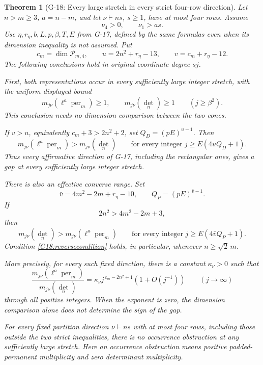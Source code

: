 \documentclass[11pt,a4paper]{article}
\newtheorem{theorem}{Theorem}
\theoremstyle{definition}\newtheorem{definition}{Definition}
\begin{document}
\begin{theorem}[G-18: Every large stretch in every strict four-row direction]\label{G-18}
Let $n>m\geq3$, $a=n-m$, and let $\nu\vdash ns$, $s\geq1$,
have at most four rows. Assume
\[
 \nu_4>0,\qquad \nu_1>as.
\]
Use $\eta,r_\eta,b,L,p,\beta,T,E$ from G-17, defined by the same
formulas even when its dimension inequality is not assumed. Put
\[
 c_m=\dim\mathcal P_{m,4},\qquad
 u=2n^2+r_\eta-13,\qquad v=c_m+r_\eta-12.
\]
The following conclusions hold in original coordinate degree $sj$.

First, both representations occur in every sufficiently large
integer stretch, with the uniform displayed bound
\begin{equation}\label{G18:occurrence}
 m_{j\nu}(\ell^a\operatorname{per}_m)\geq1,
 \qquad m_{j\nu}(\det_n)\geq1
 \qquad(j\geq\beta^2).
\end{equation}
This conclusion needs no dimension comparison between the two cones.

If $v>u$, equivalently $c_m+3>2n^2+2$, set
$Q_D=(pE)^{u-1}$. Then
\begin{equation}\label{G18:everylargepositive}
 m_{j\nu}(\ell^a\operatorname{per}_m)>m_{j\nu}(\det_n)
 \qquad\text{for every integer }j\geq E(4uQ_D+1).
\end{equation}
Thus every affirmative direction of G-17, including the rectangular
ones, gives a gap at every sufficiently large integer stretch.

There is also an effective converse range. Set
\[
 \bar v=4m^2-2m+r_\eta-10,\qquad Q_P=(pE)^{\bar v-1}.
\]
If
\begin{equation}\label{G18:reversecondition}
 2n^2>4m^2-2m+3,
\end{equation}
then
\begin{equation}\label{G18:everylargereverse}
 m_{j\nu}(\det_n)>m_{j\nu}(\ell^a\operatorname{per}_m)
 \qquad\text{for every integer }j\geq E(4\bar vQ_P+1).
\end{equation}
Condition \eqref{G18:reversecondition} holds, in particular,
whenever $n\geq\sqrt2\,m$.

More precisely, for every such fixed direction,
there is a constant $\kappa_\nu>0$ such that
\begin{equation}\label{G18:ratio}
 \frac{m_{j\nu}(\ell^a\operatorname{per}_m)}
      {m_{j\nu}(\det_n)}
  =\kappa_\nu j^{\,c_m-2n^2+1}(1+O(j^{-1}))
  \qquad(j\longrightarrow\infty)
\end{equation}
through all positive integers. When the exponent is zero, the
dimension comparison alone does not determine the sign of the gap.

For every fixed partition direction $\nu\vdash ns$ with at most
four rows, including those outside the two strict inequalities,
there is no occurrence obstruction at any sufficiently large
stretch. Here an occurrence obstruction means positive
padded-permanent multiplicity and zero determinant multiplicity.
\end{theorem}
\end{document}
